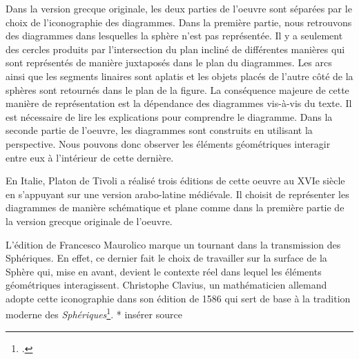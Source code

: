 \documentclass[a4paper,12pt,twoside]{book}
\begin{document}
	Dans la version grecque originale, les deux parties de l'oeuvre sont séparées par le choix de l'iconographie des diagrammes. Dans la première partie, nous retrouvons des diagrammes dans lesquelles la sphère n'est pas représentée. Il y a seulement des cercles produits par l'intersection du plan incliné de différentes manières qui sont représentés de manière juxtaposés dans le plan du diagrammes. Les arcs ainsi que les segments linaires sont aplatis et les objets placés de l'autre côté de la sphères sont retournés dans le plan de la figure. La conséquence majeure de cette manière de représentation est la dépendance des diagrammes vis-à-vis du texte. Il est nécessaire de lire les explications pour comprendre le diagramme. Dans la seconde partie de l'oeuvre, les diagrammes sont construits en utilisant la perspective. Nous pouvons donc observer les éléments géométriques interagir entre eux à l'intérieur de cette dernière.  
	
	En Italie, Platon de Tivoli a réalisé trois éditions de cette oeuvre au XVIe siècle en s'appuyant sur une version arabo-latine médiévale. Il choisit de représenter les diagrammes de manière schématique et plane comme dans la première partie de la version grecque originale de l'oeuvre. 
	
	L'édition de Francesco Maurolico marque un tournant dans la transmission des Sphériques. En effet, ce dernier fait le choix de travailler sur la surface de la Sphère qui, mise en avant, devient le contexte réel dans lequel les éléments géométriques interagissent. Christophe Clavius, un mathématicien allemand adopte cette iconographie dans son édition de 1586 qui sert de base à la tradition moderne des \textit{Sphériques}\footcite{malpangottoGraphicalChoicesGeometrical2010}. * insérer source 
	
\end{document}
